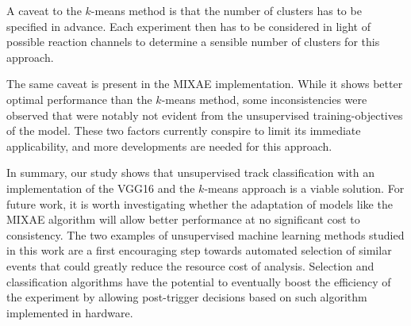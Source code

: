 \documentclass[preprint,12pt]{elsarticle}
\begin{document}
A caveat to the $k$-means method is that the number of clusters has to be specified in advance. Each experiment then has to be considered in light of possible reaction channels to determine a sensible number of clusters for this approach. 

The same caveat is present in the MIXAE implementation. While it shows better optimal performance than the $k$-means method, some inconsistencies were observed that were notably not evident from the unsupervised training-objectives of the model. These two factors currently conspire to limit its immediate applicability, and more developments are needed for this approach. 

In summary, our study shows that unsupervised track classification with an implementation of the VGG16 and the  $k$-means approach is a viable solution. For future work, it is worth investigating whether the adaptation of  models like the MIXAE algorithm will allow better performance at no significant cost to consistency.  
The two examples of unsupervised machine learning methods studied in this work are a first encouraging step towards automated selection of similar events that could  greatly reduce the resource cost of analysis. Selection and classification algorithms have the potential to eventually boost the efficiency of the experiment by allowing post-trigger decisions based on such algorithm implemented in hardware. %
\end{document}
